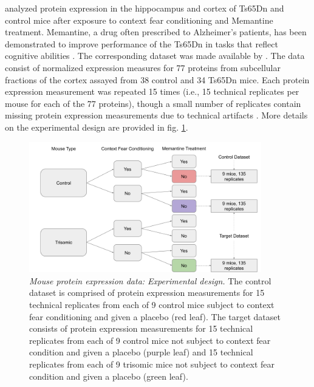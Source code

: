 \citet{Ahmed2015} analyzed protein expression in the hippocampus and cortex of Ts65Dn and control mice after exposure to context fear conditioning and Memantine treatment. Memantine, a drug often prescribed to Alzheimer's patients, has been demonstrated to improve performance of the Ts65Dn in tasks that reflect cognitive abilities \cite{Ahmed2015}. The corresponding dataset was made available by \citet{Higuera2015}. The data consist of normalized expression measures for 77 proteins from subcellular fractions of the cortex assayed from 38 control and 34 Ts65Dn mice. Each protein expression measurement was repeated 15 times (i.e., 15 technical replicates per mouse for each of the 77 proteins), though a small number of replicates contain missing protein expression measurements due to technical artifacts \cite{Higuera2015}. More details on the experimental design are provided in fig. \ref{fig:exp_design}.

\begin{figure}[!htbp]
    \centering
    \includegraphics[width=0.9\textwidth]{figures/mice_exp_design.png}
    \caption{
    {\em Mouse protein expression data: Experimental design.} 
    The control dataset is comprised of protein expression measurements for 15 technical replicates from each of 9 control mice subject to context fear conditioning and given a placebo (red leaf). The target dataset consists of protein expression measurements for 15 technical replicates from each of 9 control mice not subject to context fear condition and given a placebo (purple leaf) and 15 technical replicates from each of 9 trisomic mice not subject to context fear condition and given a placebo (green leaf).}
    \label{fig:exp_design}
\end{figure}

